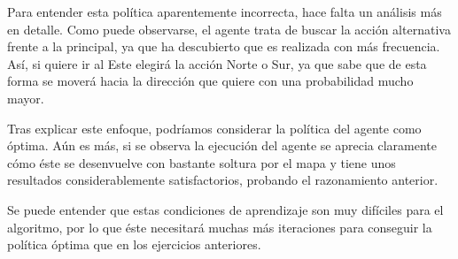 \documentclass[12pt]{article}
\begin{document}
Para entender esta política aparentemente incorrecta, hace falta un análisis más en detalle. Como puede observarse, el agente trata de buscar la acción alternativa frente a la principal, ya que ha descubierto que es realizada con más frecuencia. Así, si quiere ir al Este elegirá la acción Norte o Sur, ya que sabe que de esta forma se moverá hacia la dirección que quiere con una probabilidad mucho mayor.

Tras explicar este enfoque, podríamos considerar la política del agente como óptima. Aún es más, si se observa la ejecución del agente se aprecia claramente cómo éste se desenvuelve con bastante soltura por el mapa y tiene unos resultados considerablemente satisfactorios, probando el razonamiento anterior.

Se puede entender que estas condiciones de aprendizaje son muy difíciles para el algoritmo, por lo que éste necesitará muchas más iteraciones para conseguir la política óptima que en los ejercicios anteriores.
\end{document}
